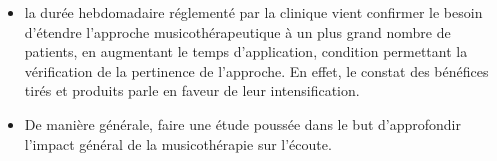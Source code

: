 \begin{itemize}
 
     \item la durée hebdomadaire réglementé par la clinique vient 
       confirmer le besoin d'étendre l'approche musicothérapeutique à
       un plus grand nombre de patients, en augmentant le temps
       d'application, condition permettant la vérification de la
       pertinence de l'approche. En effet, le constat des bénéfices
       tirés et 
       produits parle en faveur de leur intensification.

      
       
\item De manière générale, faire une étude poussée dans le but d'approfondir l'impact général de la
  musicothérapie sur l'écoute.

\end{itemize}


